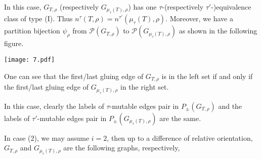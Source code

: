 \documentclass[10pt]{amsart}
\theoremstyle{theorems}
\begin{document}
In this case, $G_{T,\rho}$ (respectively $G_{\mu_{\tau}(T),\rho}$) has one $\tau$-(respectively $\tau'$-)equivalence class of type (I). Thus $n^{\tau}(T,\rho)=n^{\tau'}(\mu_{\tau}(T),\rho)$. Moreover, we have a partition bijection $\psi_{\rho}$ from $\mathcal P(G_{T,\rho})$ to $\mathcal P(G_{\mu_{\tau}(T),\rho})$ as shown in the following figure.

\centerline{\texttt{[image: 7.pdf]}}

One can  see that the first/last gluing edge of $G_{T,\rho}$ is in the left set if and only if the first/last gluing edge of $G_{\mu_{\tau}(T),\rho}$ in the right set.

\medskip

In this case, clearly the labels of $\tau$-mutable edges pair in $P_{\pm}(G_{T,\rho})$ and the labels of $\tau'$-mutable edges pair in $P_{\pm}(G_{\mu_{\tau}(T),\rho})$ are the same.

\medskip

In case (2), we may assume $i=2$, then up to a difference of relative orientation, $G_{T,\rho}$ and $G_{\mu_{\tau}(T),\rho}$ are the following graphs, respectively,

\medskip
\end{document}
